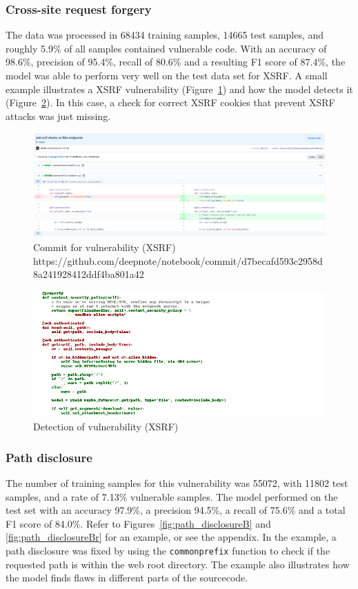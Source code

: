 \documentclass[
a4paper,
pagesize,
pdftex,
12pt,
twoside, %
BCOR=5mm, %
ngerman,
fleqn,
final,
]{scrartcl}
\begin{document}
	
	\subsubsection{Cross-site request forgery}
	The data was processed in 68434 training samples, 14665 test samples, and roughly 5.9\% of all samples contained vulnerable code. With an accuracy of 98.6\%, precision of 95.4\%, recall of 80.6\% and a resulting F1 score of 87.4\%, the model was able to perform very well on the test data set for XSRF. A small example illustrates a XSRF vulnerability (Figure~\ref{fig:xsrfA}) and how the model detects it (Figure~\ref{fig:xsrfAr}). In this case, a check for correct XSRF cookies that prevent XSRF attacks was just missing.
	
	\begin{figure}[H]
		\centering
		\includegraphics[width=\linewidth]{Images/xsrfA}
		\caption{Commit for vulnerability (XSRF) \newline \scriptsize{https://github.com/deepnote/notebook/commit/d7becafd593c2958d8a241928412ddf4ba801a42
		}}
		\label{fig:xsrfA}
	\end{figure}
	\begin{figure}[H]
		\centering
		\includegraphics[width=\linewidth]{Images/xsrfAr}
		\caption{Detection of vulnerability (XSRF)}
		\label{fig:xsrfAr}
	\end{figure}

	\subsubsection{Path disclosure}
	The number of training samples for this vulnerability was 55072, with 11802 test samples, and a rate of 7.13\% vulnerable samples.	The model performed on the test set with an accuracy 97.9\%, a precision 94.5\%, a recall of 75.6\% and a total F1 score of 84.0\%. Refer to Figures~\ref{fig:path_disclosureB} and \ref{fig:path_disclosureBr} for an example, or see the appendix. In the example, a path disclosure was fixed by using the \texttt{commonprefix} function to check if the requested path is within the web root directory. The example also illustrates how the model finds flaws in different parts of the sourcecode.
	
\end{document}
